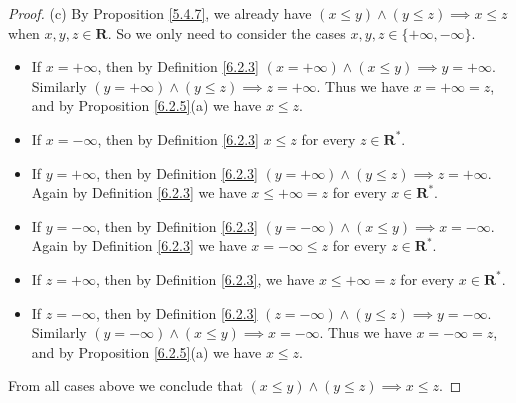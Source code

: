 \begin{proof}{(c)}
    By Proposition \ref{5.4.7}, we already have \((x \leq y) \land (y \leq z) \implies x \leq z\) when \(x, y, z \in \mathbf{R}\).
    So we only need to consider the cases \(x, y, z \in \{+\infty, -\infty\}\).
    \begin{itemize}
        \item If \(x = +\infty\), then by Definition \ref{6.2.3} \((x = +\infty) \land (x \leq y) \implies y = +\infty\).
              Similarly \((y = +\infty) \land (y \leq z) \implies z = +\infty\).
              Thus we have \(x = +\infty = z\), and by Proposition \ref{6.2.5}(a) we have \(x \leq z\).
        \item If \(x = -\infty\), then by Definition \ref{6.2.3} \(x \leq z \) for every \(z \in \mathbf{R}^*\).
        \item If \(y = +\infty\), then by Definition \ref{6.2.3} \((y = +\infty) \land (y \leq z) \implies z = +\infty\).
              Again by Definition \ref{6.2.3} we have \(x \leq +\infty = z\) for every \(x \in \mathbf{R}^*\).
        \item If \(y = -\infty\), then by Definition \ref{6.2.3} \((y = -\infty) \land (x \leq y) \implies x = -\infty\).
              Again by Definition \ref{6.2.3} we have \(x = -\infty \leq z\) for every \(z \in \mathbf{R}^*\).
        \item If \(z = +\infty\), then by Definition \ref{6.2.3}, we have \(x \leq +\infty = z\) for every \(x \in \mathbf{R}^*\).
        \item If \(z = -\infty\), then by Definition \ref{6.2.3} \((z = -\infty) \land (y \leq z) \implies y = -\infty\).
              Similarly \((y = -\infty) \land (x \leq y) \implies x = -\infty\).
              Thus we have \(x = -\infty = z\), and by Proposition \ref{6.2.5}(a) we have \(x \leq z\).
    \end{itemize}
    From all cases above we conclude that \((x \leq y) \land (y \leq z) \implies x \leq z\).
\end{proof}

